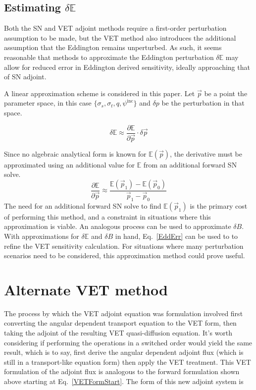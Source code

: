 \documentclass[12pt]{report}
\newcommand{\vp}{\vec{p}}
\newcommand{\Edd}{\mathbb{E}}
\newcommand{\BEdd}{B}
\begin{document}
\subsection{Estimating $\delta \Edd$}
Both the SN and VET adjoint methods require a first-order perturbation assumption to be made, but the VET method also introduces the additional assumption that the Eddington remains unperturbed. As such, it seems reasonable that methods to approximate the Eddington perturbation $\delta \Edd$ may allow for reduced error in Eddington derived sensitivity, ideally approaching that of SN adjoint. 

A linear approximation scheme is considered in this paper. Let $\vp$ be a point the  parameter space, in this case $\lbrace \sigma_s , \sigma_t, q, \psi^{\text{inc}} \rbrace$ and $\delta p$ be the perturbation in that space.

\begin{equation}
\delta \Edd \approx \frac{\partial \Edd}{\partial \vp} \cdot \delta \vp
\end{equation}

Since no algebraic analytical form is known for $\Edd ( \vp )$, the derivative must be approximated using an additional value for $\Edd$ from an additional forward SN solve.
\begin{equation}
\label{Eddapprox}
\frac{\partial \Edd}{\partial \vp} \approx \frac{\Edd(\vp_1) - \Edd(\vp_0)}{\vp_1 - \vp_0}
\end{equation}
The need for an additional forward SN solve to find $\Edd(\vp_1)$ is the primary cost of performing this method, and a constraint in situations where this approximation is viable. An analogous process can be used to approximate $\delta \BEdd$. With approximations for $\delta \Edd$ and $\delta \BEdd$ in hand, Eq.~\eqref{EddErr} can be used to to refine the VET sensitivity calculation. For situations where many perturbation scenarios need to be considered, this approximation method could prove useful. 

\section{Alternate VET method}
The process by which the VET adjoint equation was formulation involved first converting the angular dependent transport equation to the VET form, then taking the adjoint of the resulting VET quasi-diffusion equation. It's worth considering if performing the operations in a switched order would yield the same result, which is to say, first derive the angular dependent adjoint flux (which is still in a transport-like equation form) then apply the VET treatment. This VET formulation of the adjoint flux is analogous to the forward formulation shown above starting at Eq.~\eqref{VETFormStart}. The form of this new adjoint system is
\end{document}
